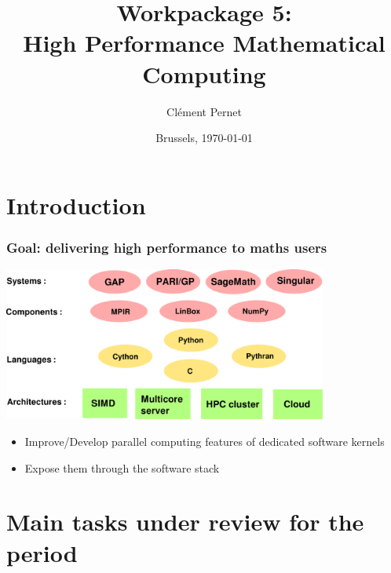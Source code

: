 \documentclass{beamer}
\title[Workpackage 5]{Workpackage 5:\\ High Performance Mathematical Computing}
\author{Clément Pernet}
\institute[ODK Project review]{First OpenDreamKit Project review}
\date{Brussels, \today}
\begin{document}
\maketitle

\section*{Introduction}
\begin{frame}
  \frametitle{Goal: delivering high performance to maths users}

    \begin{center}
    \includegraphics[width=0.8\textwidth]{software_stack}
  \end{center}

    \pause
    \begin{itemize}
    \item Improve/Develop parallel computing features of dedicated software
      kernels
    \item Expose them through the software stack
    \end{itemize}

\end{frame}

\section{Main tasks under review for the period}
\end{document}
